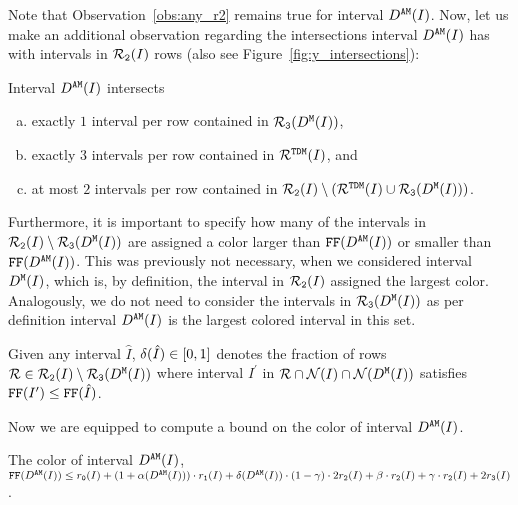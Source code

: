{%
Note that Observation~\ref{obs:any_r2} remains true for interval $D^\texttt{AM}(I)$.
Now, let us make an additional observation regarding the intersections interval $D^\texttt{AM}(I)$ has with intervals in $\mathcal{R}_\texttt{2}(I)$ rows (also see Figure~\ref{fig:y_intersections}):

\begin{observation}
    \label{obs:any_z_bar}
    Interval $D^\texttt{AM}(I)$ intersects
    \begin{enumerate}[(a)]
        \item exactly $1$ interval per row contained in $\mathcal{R}_\texttt{3}(D^\texttt{M}(I))$,
        \item exactly $3$ intervals per row contained in $\mathcal{R}^{\texttt{TDM}}(I)$, and
        \item at most $2$ intervals per row contained in $\mathcal{R}_\texttt{2}(I) \setminus (\mathcal{R}^{\texttt{TDM}}(I) \cup \mathcal{R}_\texttt{3}(D^\texttt{M}(I)) )$.
    \end{enumerate}
\end{observation}


Furthermore, it is important to specify how many of the intervals in $\mathcal{R}_\texttt{2}(I) \setminus \mathcal{R}_\texttt{3}(D^\texttt{M}(I))$ are assigned a color larger than $\text{\texttt{FF}}(D^\texttt{AM}(I))$ or smaller than $\text{\texttt{FF}}(D^\texttt{AM}(I))$.
This was previously not necessary, when we considered interval $D^\texttt{M}(I)$, which is, by definition, the interval in $\mathcal{R}_\texttt{2}(I)$ assigned the largest color.
Analogously, we do not need to consider the intervals in $\mathcal{R}_\texttt{3}(D^\texttt{M}(I))$ as per definition interval $D^\texttt{AM}(I)$ is the largest colored interval in this set.

\begin{definition}
    \label{def:delta}
    Given any interval $\hat{I}$, $\delta(\hat{I}) \in [0, 1]$ denotes the fraction of rows $\mathcal{R} \in \mathcal{R}_\texttt{2}(I) \setminus \mathcal{R}_\texttt{3}(D^\texttt{M}(I))$ where interval $I^\prime$ in $\mathcal{R} \cap \mathcal{N}(I) \cap \mathcal{N}(D^\texttt{M}(I))$ satisfies $\text{\texttt{FF}}(I^\prime) \leq \text{\texttt{FF}}(\hat{I})$.
\end{definition}

Now we are equipped to compute a bound on the color of interval $D^\texttt{AM}(I)$.

\begin{lemma}
    \label{lem:any_z_bar}
    The color of interval $D^\texttt{AM}(I)$, $\text{\texttt{FF}}(D^\texttt{AM}(I)) \leq r_\texttt{0}(I) + (1 + \alpha(D^\texttt{AM}(I))) \cdot r_\texttt{1}(I) + \delta(D^\texttt{AM}(I)) \cdot (1 - \gamma ) \cdot 2r_\texttt{2}(I) + \beta  \cdot r_\texttt{2}(I) + \gamma  \cdot r_\texttt{2}(I) + 2r_\texttt{3}(I)$.
\end{lemma}

}
